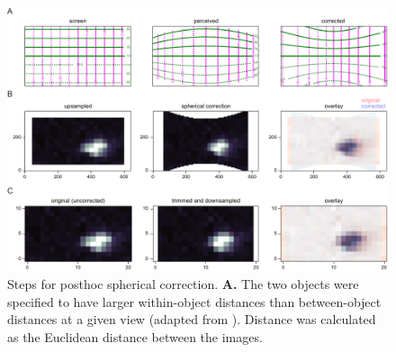 \begin{figure}[t!]
\includegraphics[width=\textwidth]{figures/supplemental/fig_sX_spherical_correction_steps/fig_sX_spherical_correction_steps.pdf}
    \vspace{.1in}
    \caption[Spherical correction]{Steps for posthoc spherical correction.
    \textbf{A.} The two objects were specified to have larger within-object distances than between-object distances at a given view (adapted from \cite{Zoccolan2009}). Distance was calculated as the Euclidean distance between the images. 
    \label{supfig:spherical_correction_steps}}
\end{figure}

